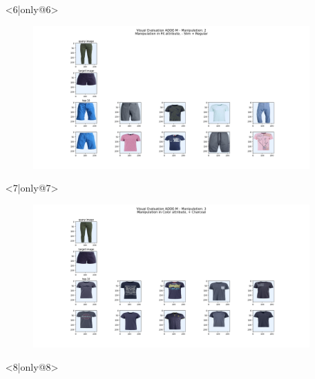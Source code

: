 \documentclass{beamer}
\begin{document}
\begin{frame}
\begin{itemize}
\begin{figure}[!h]
\begin{center}
 			\end{center}
\end{figure}
\item[] <6|only@6> 
\hspace{-20px}
\begin{figure}[!h]
 			\begin{center}
 			\hspace{-80px}
 			\includegraphics[scale=0.28]{"Immagini/4.6.png"}
 			\end{center}
\end{figure}
\item[] <7|only@7> 
\hspace{-20px}
\begin{figure}[!h]
 			\begin{center}
 			\hspace{-80px}
 			\includegraphics[scale=0.28]{"Immagini/4.7.png"}
 			\end{center}
\end{figure}
\item[] <8|only@8>
\hspace{-20px} 
\begin{figure}[!h]
 			\begin{center}
 			\hspace{-80px}

\end{center}
\end{figure}
\end{itemize}
\end{frame}
\end{document}
